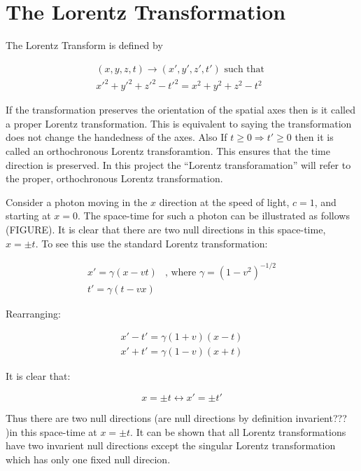 \section{The Lorentz Transformation}

The Lorentz Transform is defined by 

\begin{eqnarray*}
(x,y,z,t) \rightarrow (x',y',z',t') \text{ such that } \\
{x'}^2 + {y'}^2 + {z'}^2 - {t'}^2 = x^2 + y^2 + z^2 - t^2 
\end{eqnarray*}

\noindent If the transformation preserves the orientation of the spatial axes then is it called a proper Lorentz transformation. This is equivalent to saying the transformation does not change the handedness of the axes. Also If $t \geq 0 \Rightarrow t' \geq 0$ then it is called an orthochronous Lorentz transforamtion. This ensures that the time direction is preserved. In this project the ``Lorentz transforamation'' will refer to the proper, orthochronous Lorentz transformation.

Consider a photon moving in the $x$ direction at the speed of light, $c = 1$, and starting at $x = 0$. The space-time for such a photon can be illustrated as follows (FIGURE). It is clear that there are two null directions in this space-time, $x = \pm t$. To see this use the standard Lorentz transformation:

\begin{eqnarray*}
x'  = \gamma (x - vt) & \text{, where } \gamma = {(1 - v^2)}^{-1/2} \\
t'  = \gamma (t - vx) & 
\end{eqnarray*}

\noindent Rearranging:

\begin{eqnarray*}
x' - t' = \gamma (1 + v) (x - t) \\
x' + t' = \gamma (1 - v) (x + t)
\end{eqnarray*}

\noindent It is clear that:

$$x = \pm t \leftrightarrow x' = \pm t'$$

\noindent Thus there are two null directions (are null directions by definition invarient??? )in this space-time at $x = \pm t$. It can be shown that all Lorentz transformations have two invarient null directions except the singular Lorentz transformation which has only one fixed null direcion.  
